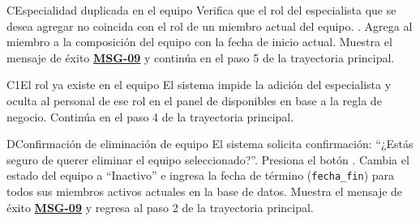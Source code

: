 \begin{UCtrayectoriaA}{C}{Especialidad duplicada en el equipo}
	\UCpaso Verifica que el rol del especialista que se desea agregar no coincida con el rol de un miembro actual del equipo. .
	\UCpaso Agrega al miembro a la composición del equipo con la fecha de inicio actual.
	\UCpaso Muestra el mensaje de éxito \hyperlink{mMSG09}{\bf MSG-09} y continúa en el paso 5 de la trayectoria principal.
\end{UCtrayectoriaA}

\begin{UCtrayectoriaA}{C1}{El rol ya existe en el equipo}
	\UCpaso El sistema impide la adición del especialista y oculta al personal de ese rol en el panel de disponibles en base a la regla de negocio.
	\UCpaso Continúa en el paso 4 de la trayectoria principal.
\end{UCtrayectoriaA}

\begin{UCtrayectoriaA}{D}{Confirmación de eliminación de equipo}
	\UCpaso El sistema solicita confirmación: ``¿Estás seguro de querer eliminar el equipo seleccionado?''.
	\UCpaso[\UCactor] Presiona el botón .
	\UCpaso Cambia el estado del equipo a ``Inactivo'' e ingresa la fecha de término (\texttt{fecha\_fin}) para todos sus miembros activos actuales en la base de datos.
	\UCpaso Muestra el mensaje de éxito \hyperlink{mMSG09}{\bf MSG-09} y regresa al paso 2 de la trayectoria principal.
\end{UCtrayectoriaA}
